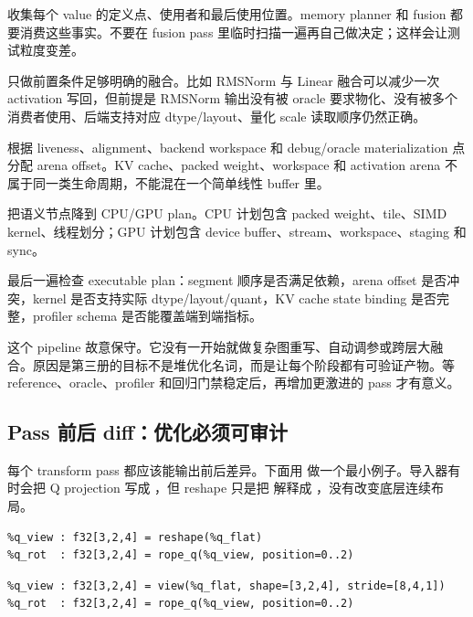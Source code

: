  收集每个 value 的定义点、使用者和最后使用位置。memory planner 和 fusion 都要消费这些事实。不要在 fusion pass 里临时扫描一遍再自己做决定；这样会让测试粒度变差。

 只做前置条件足够明确的融合。比如 RMSNorm 与 Linear 融合可以减少一次 activation 写回，但前提是 RMSNorm 输出没有被 oracle 要求物化、没有被多个消费者使用、后端支持对应 dtype/layout、量化 scale 读取顺序仍然正确。

 根据 liveness、alignment、backend workspace 和 debug/oracle materialization 点分配 arena offset。KV cache、packed weight、workspace 和 activation arena 不属于同一类生命周期，不能混在一个简单线性 buffer 里。

 把语义节点降到 CPU/GPU plan。CPU 计划包含 packed weight、tile、SIMD kernel、线程划分；GPU 计划包含 device buffer、stream、workspace、staging 和 sync。

 最后一遍检查 executable plan：segment 顺序是否满足依赖，arena offset 是否冲突，kernel 是否支持实际 dtype/layout/quant，KV cache state binding 是否完整，profiler schema 是否能覆盖端到端指标。

这个 pipeline 故意保守。它没有一开始就做复杂图重写、自动调参或跨层大融合。原因是第三册的目标不是堆优化名词，而是让每个阶段都有可验证产物。等 reference、oracle、profiler 和回归门禁稳定后，再增加更激进的 pass 才有意义。

\subsection{Pass 前后 diff：优化必须可审计}

每个 transform pass 都应该能输出前后差异。下面用  做一个最小例子。导入器有时会把 Q projection 写成 ，但 reshape 只是把 \code{[T,8]} 解释成 \code{[T,2,4]}，没有改变底层连续布局。

\begin{lstlisting}[numbers=none,caption={pass 前的 IR}]
%q_flat : f32[3,8]   = linear(%x_norm, @wq)
%q_view : f32[3,2,4] = reshape(%q_flat)
%q_rot  : f32[3,2,4] = rope_q(%q_view, position=0..2)
\end{lstlisting}

\begin{lstlisting}[numbers=none,caption={pass 后的 IR}]
%q_flat : f32[3,8]   = linear(%x_norm, @wq)
%q_view : f32[3,2,4] = view(%q_flat, shape=[3,2,4], stride=[8,4,1])
%q_rot  : f32[3,2,4] = rope_q(%q_view, position=0..2)
\end{lstlisting}

